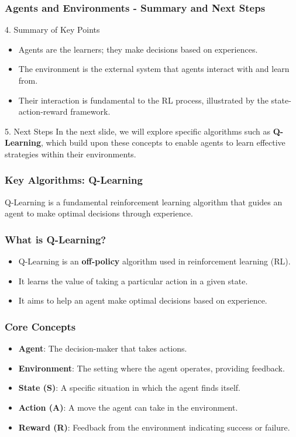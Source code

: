 \documentclass[aspectratio=169]{beamer}
\begin{document}
\begin{frame}[fragile]
    \frametitle{Agents and Environments - Summary and Next Steps}
    \begin{block}{4. Summary of Key Points}
        \begin{itemize}
            \item Agents are the learners; they make decisions based on experiences.
            \item The environment is the external system that agents interact with and learn from.
            \item Their interaction is fundamental to the RL process, illustrated by the state-action-reward framework.
        \end{itemize}
    \end{block}
    
    \begin{block}{5. Next Steps}
        In the next slide, we will explore specific algorithms such as \textbf{Q-Learning}, which build upon these concepts to enable agents to learn effective strategies within their environments.
    \end{block}
\end{frame}

\begin{frame}[fragile]
    \frametitle{Key Algorithms: Q-Learning}
    Q-Learning is a fundamental reinforcement learning algorithm that guides an agent to make optimal decisions through experience.
\end{frame}

\begin{frame}[fragile]
    \frametitle{What is Q-Learning?}
    \begin{itemize}
        \item Q-Learning is an \textbf{off-policy} algorithm used in reinforcement learning (RL).
        \item It learns the value of taking a particular action in a given state.
        \item It aims to help an agent make optimal decisions based on experience.
    \end{itemize}
\end{frame}

\begin{frame}[fragile]
    \frametitle{Core Concepts}
    \begin{itemize}
        \item \textbf{Agent}: The decision-maker that takes actions.
        \item \textbf{Environment}: The setting where the agent operates, providing feedback.
        \item \textbf{State (S)}: A specific situation in which the agent finds itself.
        \item \textbf{Action (A)}: A move the agent can take in the environment.
        \item \textbf{Reward (R)}: Feedback from the environment indicating success or failure.
    \end{itemize}
\end{frame}
\end{document}
